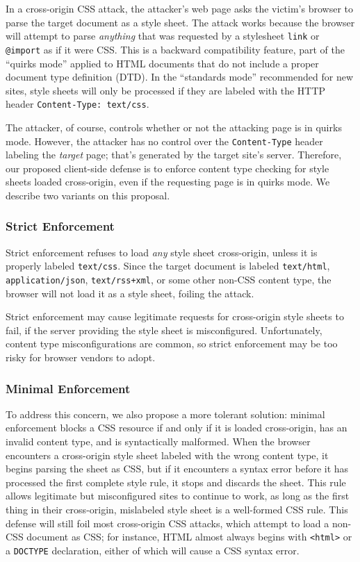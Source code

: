\documentclass{sig-alternate}
\begin{document}
In a cross-origin CSS attack, the attacker’s web page asks the
victim’s browser to parse the target document as a style sheet.  The
attack works because the browser will attempt to parse \emph{anything}
that was requested by a stylesheet \verb|link| or \verb|@import| as if
it were CSS. This is a backward compatibility feature, part of the
“quirks mode” applied to HTML documents that do not include a proper
document type definition (DTD). In the “standards mode” recommended
for new sites, style sheets will only be processed if they are labeled
with the HTTP header \verb|Content-Type: text/css|.

The attacker, of course, controls whether or not the attacking page is
in quirks mode. However, the attacker has no control over the
\texttt{Content-Type} header labeling the \emph{target} page; that's
generated by the target site's server. Therefore, our proposed
client-side defense is to enforce content type checking for style
sheets loaded cross-origin, even if the requesting page is in quirks
mode.  We describe two variants on this proposal.

\subsubsection{Strict Enforcement} \label{sec:strict}
Strict enforcement refuses to load \emph{any} style sheet
cross-origin, unless it is properly labeled
\texttt{text\slash{}css}. Since the target document is labeled
\texttt{text\slash{}html}, \texttt{application\slash{}json},
\texttt{text\slash{}rss+xml}, or some other non-CSS content type, the
browser will not load it as a style sheet, foiling the attack.

Strict enforcement may cause legitimate requests for cross-origin
style sheets to fail, if the server providing the style sheet is
misconfigured.  Unfortunately, content type misconfigurations are
common, so strict enforcement may be too risky for browser vendors to
adopt.

\subsubsection{Minimal Enforcement}
To address this concern, we also propose a more tolerant solution:
minimal enforcement blocks a CSS resource if and only if it is loaded
cross-origin, has an invalid content type, and is syntactically
malformed. When the browser encounters a cross-origin style sheet
labeled with the wrong content type, it begins parsing the sheet as
CSS, but if it encounters a syntax error before it has processed the
first complete style rule, it stops and discards the sheet. This rule
allows legitimate but misconfigured sites to continue to work, as long
as the first thing in their cross-origin, mislabeled style sheet is a
well-formed CSS rule. This defense will still foil most cross-origin
CSS attacks, which attempt to load a non-CSS document as CSS; for
instance, HTML almost always begins with \verb|<html>| or a
\verb|DOCTYPE| declaration, either of which will cause a CSS syntax
error.
\end{document}

